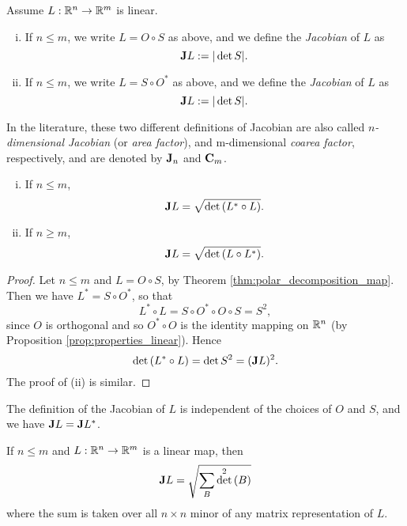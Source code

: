 \begin{definition}[Jacobian]
Assume $L : \mathbb{R}^{n} \to \mathbb{R}^{m}$ is linear.
\begin{enumerate}[i)]
\item If $n \le m$, we write $L = O \circ S$ as above, and we define the {\em Jacobian} of $L$ as $${\bf J} L := |\det{S}|.$$ 
\item If $n \le m$, we write $L = S \circ O^{*}$ as above, and we define the {\em Jacobian} of $L$ as $${\bf J} L := |\det{S}|.$$ 
\end{enumerate}
\end{definition}

In the literature, these two different definitions of Jacobian are also called {\em $n$-dimensional Jacobian} (or {\em area factor}), and {m}-dimensional {\em coarea factor}, respectively, and are denoted by ${\bf J}_{n}$ and ${\bf C}_{m}$.

\begin{theorem} \hfill
\begin{enumerate}[i)]
\item If $n \le m$, $${\bf J} L = \sqrt{\det{(L^{*} \circ L)}}.$$
\item If $n \ge m$, $${\bf J} L = \sqrt{\det{(L \circ L^{*})}}.$$
\end{enumerate}
\end{theorem}
\begin{proof}
Let $n \le m$ and $L = O \circ S$, by Theorem \ref{thm:polar_decomposition_map}. Then we have $L^{*} = S \circ O^{*}$, so that $$L^{*} \circ L = S \circ O^{*} \circ O \circ S = S^{2},$$ since $O$ is orthogonal and so $O^{*} \circ O$ is the identity mapping on $\mathbb{R}^{n}$ (by Proposition \ref{prop:properties_linear}). Hence $$\det{(L^{*} \circ L)} = \det{S^{2}} = ({\bf J} L)^{2}.$$
The proof of (ii) is similar.
\end{proof}

\begin{remark}
The definition of the Jacobian of $L$ is independent of the choices of $O$ and $S$, and we have ${\bf J} L = {\bf J} L^{*}$.
\end{remark}

\begin{proposition} \label{Cauchy_Binet}
If $n \le m$ and $L: \mathbb{R}^{n} \to \mathbb{R}^{m}$ is a linear map, then
\begin{equation*}
{\bf J} L = \sqrt{ \sum_{B} \det^{2}{(B)}}
\end{equation*}
where the sum is taken over all $n\times n$ minor of any matrix representation of $L$.
\end{proposition}


